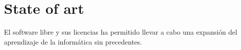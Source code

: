 \chapter{State of art}

El software libre y sus licencias \cite{gplv3} ha permitido llevar a cabo una expansión del
aprendizaje de la informática sin precedentes.
